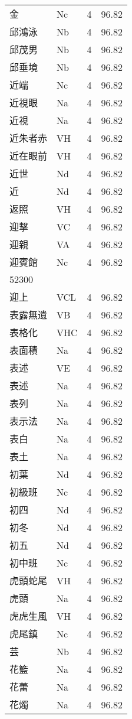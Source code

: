\documentclass[twocolumn]{book}
\begin{document}
\begin{supertabular}{llrr}
金 & Nc & 4 &  96.82\\
邱鴻泳 & Nb & 4 &  96.82\\
邱茂男 & Nb & 4 &  96.82\\
邱垂境 & Nb & 4 &  96.82\\
近端 & Nc & 4 &  96.82\\
近視眼 & Na & 4 &  96.82\\
近視 & Na & 4 &  96.82\\
近朱者赤 & VH & 4 &  96.82\\
近在眼前 & VH & 4 &  96.82\\
近世 & Nd & 4 &  96.82\\
近 & Nd & 4 &  96.82\\
返照 & VH & 4 &  96.82\\
迎擊 & VC & 4 &  96.82\\
迎親 & VA & 4 &  96.82\\
迎賓館 & Nc & 4 &  96.82\\
52300\\
迎上 & VCL & 4 &  96.82\\
表露無遺 & VB & 4 &  96.82\\
表格化 & VHC & 4 &  96.82\\
表面積 & Na & 4 &  96.82\\
表述 & VE & 4 &  96.82\\
表述 & Na & 4 &  96.82\\
表列 & Na & 4 &  96.82\\
表示法 & Na & 4 &  96.82\\
表白 & Na & 4 &  96.82\\
表土 & Na & 4 &  96.82\\
初葉 & Nd & 4 &  96.82\\
初級班 & Nc & 4 &  96.82\\
初四 & Nd & 4 &  96.82\\
初冬 & Nd & 4 &  96.82\\
初五 & Nd & 4 &  96.82\\
初中班 & Nc & 4 &  96.82\\
虎頭蛇尾 & VH & 4 &  96.82\\
虎頭 & Na & 4 &  96.82\\
虎虎生風 & VH & 4 &  96.82\\
虎尾鎮 & Nc & 4 &  96.82\\
芸 & Nb & 4 &  96.82\\
花籃 & Na & 4 &  96.82\\
花蕾 & Na & 4 &  96.82\\
花燭 & Na & 4 &  96.82\\

\end{supertabular}
\end{document}
